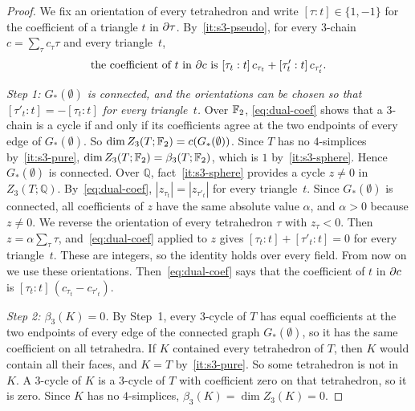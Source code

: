\begin{proof}
We fix an orientation of every tetrahedron and write $[\tau:t]\in\{1,-1\}$ for the coefficient of a triangle $t$ in $\partial\tau$.
By~\ref{it:s3-pseudo}, for every $3$-chain $c=\sum_{\tau}c_\tau\tau$ and every triangle~$t$,
\begin{equation}\label{eq:dual-coef}
  \text{the coefficient of $t$ in $\partial c$ is } [\tau_t:t]\,c_{\tau_t}+[\tau'_t:t]\,c_{\tau'_t}.
\end{equation}

\emph{Step 1: $G_\ast(\emptyset)$ is connected, and the orientations can be chosen so that $[\tau'_t:t]=-[\tau_t:t]$ for every triangle~$t$.}
Over $\mathbb{F}_2$, \eqref{eq:dual-coef} shows that a $3$-chain is a cycle if and only if its coefficients agree at the two endpoints of every edge of $G_\ast(\emptyset)$.
So $\dim Z_3(T;\mathbb{F}_2)=c(G_\ast(\emptyset))$.
Since $T$ has no $4$-simplices by~\ref{it:s3-pure}, $\dim Z_3(T;\mathbb{F}_2)=\beta_3(T;\mathbb{F}_2)$, which is $1$ by~\ref{it:s3-sphere}.
Hence $G_\ast(\emptyset)$ is connected.
Over $\mathbb{Q}$, fact~\ref{it:s3-sphere} provides a cycle $z\ne0$ in $Z_3(T;\mathbb{Q})$.
By~\eqref{eq:dual-coef}, $|z_{\tau_t}|=|z_{\tau'_t}|$ for every triangle~$t$.
Since $G_\ast(\emptyset)$ is connected, all coefficients of $z$ have the same absolute value $\alpha$, and $\alpha>0$ because $z\ne0$.
We reverse the orientation of every tetrahedron $\tau$ with $z_\tau<0$.
Then $z=\alpha\sum_\tau\tau$, and~\eqref{eq:dual-coef} applied to $z$ gives $[\tau_t:t]+[\tau'_t:t]=0$ for every triangle~$t$.
These are integers, so the identity holds over every field.
From now on we use these orientations.
Then~\eqref{eq:dual-coef} says that the coefficient of $t$ in $\partial c$ is $[\tau_t:t]\,(c_{\tau_t}-c_{\tau'_t})$.

\emph{Step 2: $\beta_3(K)=0$.}
By Step~1, every $3$-cycle of $T$ has equal coefficients at the two endpoints of every edge of the connected graph $G_\ast(\emptyset)$, so it has the same coefficient on all tetrahedra.
If $K$ contained every tetrahedron of $T$, then $K$ would contain all their faces, and $K=T$ by~\ref{it:s3-pure}.
So some tetrahedron is not in~$K$.
A $3$-cycle of $K$ is a $3$-cycle of $T$ with coefficient zero on that tetrahedron, so it is zero.
Since $K$ has no $4$-simplices, $\beta_3(K)=\dim Z_3(K)=0$.


\end{proof}
